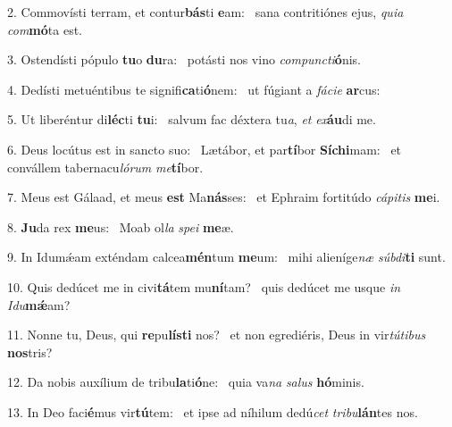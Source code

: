 2. Commovísti terram, et contur\textbf{bás}ti \textbf{e}am: \ast\  sana contritiónes ejus, \textit{qui}\textit{a} \textit{com}\textbf{mó}ta est.\

3. Ostendísti pópulo \textbf{tu}o \textbf{du}ra: \ast\  potásti nos vino \textit{com}\textit{punc}\textit{ti}\textbf{ó}nis.\

4. Dedísti metuéntibus te signifi\textbf{ca}ti\textbf{ó}nem: \ast\  ut fúgiant a \textit{fá}\textit{ci}\textit{e} \textbf{ar}cus:\

5. Ut liberéntur di\textbf{léc}ti \textbf{tu}i: \ast\  salvum fac déxtera tu\textit{a}, \textit{et} \textit{ex}\textbf{áu}di me.\

6. Deus locútus est in sancto suo: \dag\  Lætábor, et par\textbf{tí}bor \textbf{Sí}\textbf{chi}mam: \ast\  et convállem tabernacu\textit{ló}\textit{rum} \textit{me}\textbf{tí}bor.\

7. Meus est Gálaad, et meus \textbf{est} Ma\textbf{nás}ses: \ast\  et Ephraim fortitúdo \textit{cá}\textit{pi}\textit{tis} \textbf{me}i.\

8. \textbf{Ju}da rex \textbf{me}us: \ast\  Moab ol\textit{la} \textit{spe}\textit{i} \textbf{me}æ.\

9. In Idumǽam exténdam calcea\textbf{mén}tum \textbf{me}um: \ast\  mihi alieníge\textit{næ} \textit{súb}\textit{di}\textbf{ti} sunt.\

10. Quis dedúcet me in civi\textbf{tá}tem mu\textbf{ní}tam? \ast\  quis dedúcet me usque \textit{in} \textit{I}\textit{du}\textbf{mǽ}am?\

11. Nonne tu, Deus, qui \textbf{re}pu\textbf{lís}\textbf{ti} nos? \ast\  et non egrediéris, Deus in vir\textit{tú}\textit{ti}\textit{bus} \textbf{nos}tris?\

12. Da nobis auxílium de tribu\textbf{la}ti\textbf{ó}ne: \ast\  quia va\textit{na} \textit{sa}\textit{lus} \textbf{hó}minis.\

13. In Deo faci\textbf{é}mus vir\textbf{tú}tem: \ast\  et ipse ad níhilum dedú\textit{cet} \textit{tri}\textit{bu}\textbf{lán}tes nos.\

